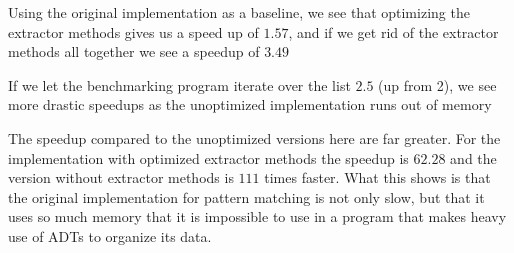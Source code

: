 \documentclass[10pt]{report}
\begin{document}
{
\par{Using the original implementation as a baseline, we see that optimizing the extractor methods gives us a speed up of $1.57$, and if we get rid of the extractor methods all together we see a speedup of $3.49$}
\par{If we let the benchmarking program iterate over the list $2.5$ (up from 2), we see more drastic speedups as the unoptimized implementation runs out of memory}

\par{The speedup compared to the unoptimized versions here are far greater. For the implementation with optimized extractor methods the speedup is $62.28$ and the version without extractor methods is $111$ times faster. What this shows is that the original implementation for pattern matching is not only slow, but that it uses so much memory that it is impossible to use in a program that makes heavy use of ADTs to organize its data.}

}
\end{document}
